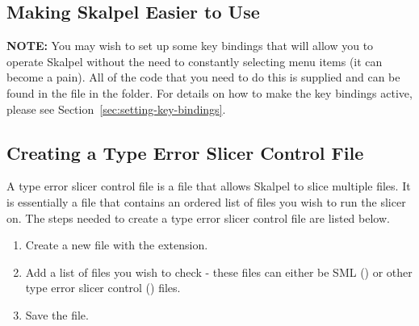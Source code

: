 \documentclass{report}
\begin{document}

\subsection{Making Skalpel Easier to Use}

\textbf{NOTE:} You may wish to set up some key bindings that will
allow you to operate Skalpel without the need to
constantly selecting menu items (it can become a pain).  All of the
code that you need to do this is supplied and can be found in the
 file in the  folder.
For details on how to make the key bindings active, please see
Section~\ref{sec:setting-key-bindings}.


\subsection{Creating a Type Error Slicer Control File}
\label{sec:skalpel-control-files}

A type error slicer control file is a file that allows Skalpel to
slice multiple files. It is essentially a file that contains an
ordered list of files you wish to run the slicer on. The steps needed
to create a type error slicer control file are listed below.

\begin{enumerate}
\item Create a new file with the  extension.
\item Add a list of files you wish to check - these files can either
  be SML () or other type error slicer control
  () files.

\item Save the file.
\end{enumerate}


\newpage

\end{document}
